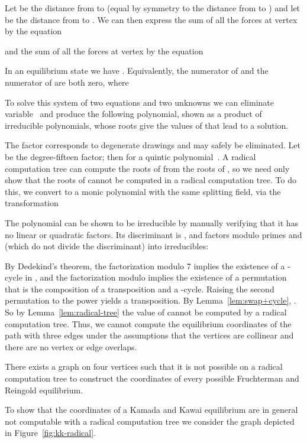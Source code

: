 \documentclass[oribibl,10pt]{llncs}
\begin{document}
Let  be the distance from  to  (equal by symmetry to the distance from  to ) and let  be the distance from  to . We can then express the sum of all the forces at vertex  by the equation

and the sum of all the forces at vertex  by the equation

In an equilibrium state we have . Equivalently, the numerator  of  and the numerator  of  are both zero, where

To solve this system of two equations and two unknowns we can eliminate variable~ and produce the following polynomial, shown as a product of irreducible polynomials, whose roots give the values of  that lead to a solution.

The factor  corresponds to degenerate drawings and may safely be eliminated.
Let  be the degree-fifteen factor; then  for a quintic polynomial~. A radical computation tree can compute the roots of  from the roots of , so we need only show that the roots of  cannot be computed in a radical computation tree. To do this, we convert  to a monic polynomial  with the same splitting field, via the transformation

The polynomial  can be shown to be irreducible by manually verifying that it has no linear or quadratic factors. Its discriminant is , and  factors modulo primes  and  (which do not divide the discriminant) into irreducibles:

By Dedekind's theorem, the factorization modulo 7 implies the existence of a -cycle in , and the factorization modulo  implies the existence of a permutation that is the composition of a transposition and a -cycle.
 Raising the second permutation to the power  yields a transposition. 
By Lemma~\ref{lem:swap+cycle}, . 
So by Lemma~\ref{lem:radical-tree} the value of  cannot be computed by a radical computation tree. 
Thus, we cannot compute the equilibrium coordinates of the path with three edges under the assumptions that the vertices are collinear and there are no vertex or edge overlaps.

\begin{theorem}
There exists a graph on four vertices such that it is not possible on a radical computation tree to construct the coordinates of every possible Fruchterman and Reingold equilibrium.
\end{theorem}

To show that the coordinates of a Kamada and Kawai equilibrium are in general not computable with a radical computation tree we consider the graph depicted in Figure~\ref{fig:kk-radical}.
\end{document}
